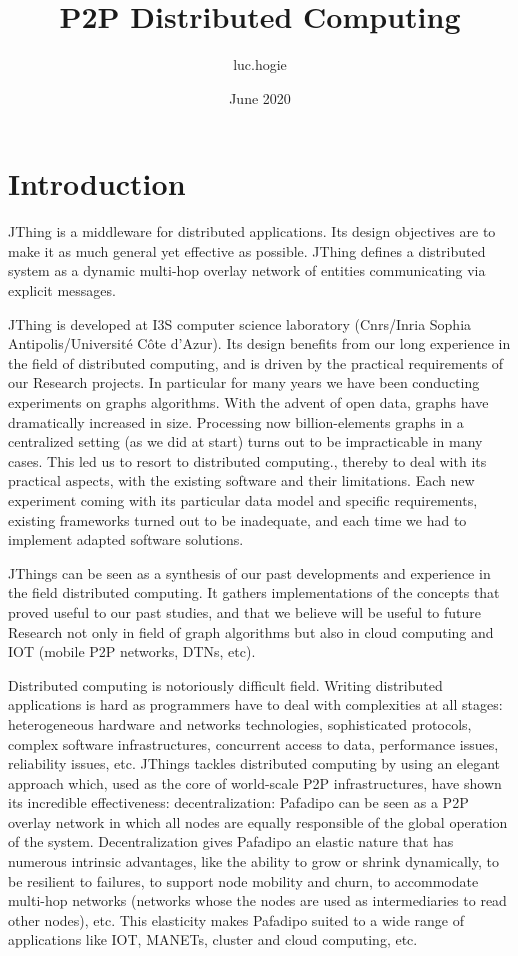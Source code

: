 \documentclass{article}
\title{P2P Distributed Computing}
\author{luc.hogie}
\date{June 2020}
\begin{document}
\maketitle

\section{Introduction}


JThing is a middleware for distributed applications. Its design objectives are to make it as much general yet effective as possible. JThing defines a distributed system as a dynamic multi-hop overlay network of entities communicating via explicit messages. 

JThing is developed at I3S computer science laboratory (Cnrs/Inria Sophia Antipolis/Université Côte d'Azur). Its design benefits from our long experience in the field of distributed computing, and is driven by the practical requirements of our Research projects. In particular for many years we have been conducting experiments on graphs algorithms. With the advent of open data, graphs have dramatically increased in size. Processing now billion-elements graphs in a centralized setting (as we did at start) turns out to be impracticable in many cases. This led us to resort to distributed computing., thereby to deal with its practical aspects, with the existing software and their limitations. Each new experiment coming with its particular data model and specific requirements, existing frameworks turned out to be inadequate, and each time we had to implement adapted software solutions.

JThings can be seen as a synthesis of our past developments and experience in the field distributed computing. It gathers implementations of the concepts that proved useful to our past studies, and that we believe will be useful to future Research not only in field of graph algorithms but also in  cloud computing and IOT (mobile P2P networks, DTNs, etc).

Distributed computing is notoriously difficult field. Writing distributed applications is hard as programmers have to deal with complexities at all stages: heterogeneous hardware and networks technologies, sophisticated protocols, complex software infrastructures, concurrent access to data, performance issues, reliability issues, etc.
JThings tackles distributed computing by using an elegant approach which, used as the core of world-scale P2P infrastructures, have shown its incredible effectiveness: decentralization: Pafadipo can be seen as a P2P overlay network in which all nodes are equally responsible of the global operation of the system. Decentralization gives Pafadipo an elastic nature that has numerous intrinsic advantages, like the ability to grow or shrink dynamically, to be resilient to failures, to support node mobility and churn, to accommodate multi-hop networks (networks whose the nodes are used as intermediaries to read other nodes), etc.
This elasticity makes Pafadipo suited to a wide range of applications like IOT, MANETs, cluster and cloud computing, etc.
\end{document}
